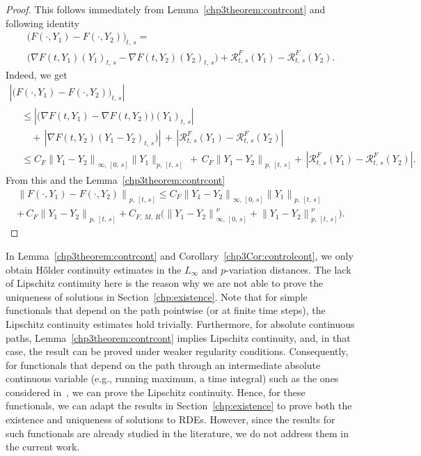 \documentclass[AHL,Unicode,longabstracts,published]{cedram}
\newcommand{\calR}{\mathcal{R}}
\begin{document}
\begin{proof}
This follows immediately from Lemma~\ref{chp3theorem:contrcont} and following identity
\begin{multline*}
\big(F(\cdot,Y_1)-F(\cdot, Y_2)\big)_{t,\,s}=\\
\big(\nabla F(t,Y_1)(Y_1)_{t,\,s}-\nabla F(t, Y_2)(Y_2)_{t,\,s}\big)
+\calR^{F}_{t,\,s}(Y_1)-\calR^{F}_{t,\,s}(Y_2).
\end{multline*}
Indeed, we get
\begin{multline*}
\left|\big(F(\cdot,Y_1)-F(\cdot, Y_2)\big)_{t,\,s}\right|\\
\begin{aligned}
&\leq \left|\big(\nabla F(t,Y_1)-\nabla F(t, Y_2)\big)(Y_1)_{t,\,s}\right|\,\\
&\quad+\,\left|\nabla F(t, Y_2)(Y_1-Y_2)_{t,\,s})\right|\, +\,\left|\calR^{F}_{t,\,s}(Y_1)-\calR^{F}_{t,\,s}(Y_2)\right|\\
&\leq C_F \left\|Y_1-Y_2\right\|_{\infty,\,[0, \,s]} \|Y_1\|_{p,\,[t,\,s]}\,+\, C_F \left\|Y_1-Y_2\right\|_{p,\,[t,\,s]} +\,\left|\calR^{F}_{t,\,s}(Y_1)-\calR^{F}_{t,\,s}(Y_2)\right|.
\end{aligned}
\end{multline*}
From this and the Lemma~\ref{chp3theorem:contrcont}
\begin{multline*}
\left\|F(\cdot,Y_1)-F(\cdot, Y_2)\right\|_{p,\,[t,\,s]}
\leq C_F \left\|Y_1-Y_2\right\|_{\infty,\,[0,\,s]} \left\|Y_1\right\|_{p,\,[t,\,s]}\\
+\, C_F \left\|Y_1-Y_2\right\|_{p,\,[t,\,s]}
+ C_{F,\,M,\,R} \Big(\left\|Y_1-Y_2\right\|_{\infty,\,[0,\,s]}^{\nu}+\left\|Y_1-Y_2\right\|_{p,\,[t,\,s]}^{\nu}\Big).
\end{multline*}
\end{proof}


\begin{rema}\label{remark:Lipcontrol}
In Lemma~\ref{chp3theorem:contrcont} and Corollary~\ref{chp3Cor:controlcont}, we only obtain H\H older continuity estimates in the $L_{\infty}$ and $p$-variation distances. The lack of Lipschitz continuity here is the reason why we are not able to prove the uniqueness of solutions in Section~\ref{chp:existence}. Note that for simple functionals that depend on the path pointwise (or at finite time steps), the Lipschitz continuity estimates hold trivially. Furthermore, for absolute continuous paths, Lemma~\ref{chp3theorem:contrcont} implies Lipschitz continuity, and, in that case, the result can be proved under weaker regularity conditions. Consequently, for functionals that depend on the path through an intermediate absolute continuous variable (e.g., running maximum, a time integral) such as the ones considered in~\cite{aida2019}, we can prove the Lipschitz continuity. Hence, for these functionals, we can adapt the results in Section~\ref{chp:existence} to prove both the existence and uniqueness of solutions to RDEs. However, since the results for such functionals are already studied in the literature, we do not address them in the current work.
\end{rema}
\end{document}
